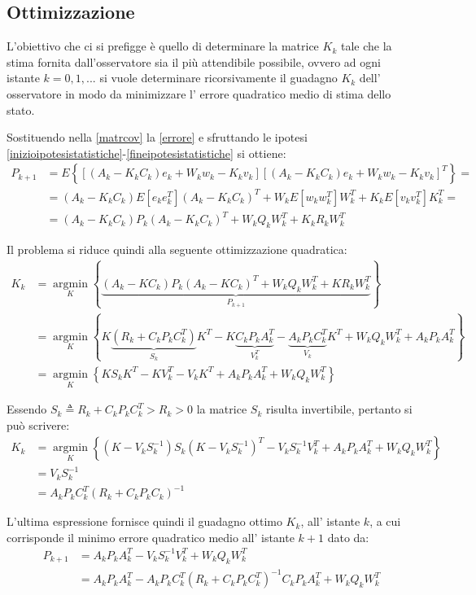 \subsection{Ottimizzazione}
L'obiettivo che ci si prefigge è quello di determinare la matrice $K_k$ tale che la stima fornita dall'osservatore sia il più attendibile possibile, ovvero ad ogni istante $k=0,1,...$ si vuole determinare ricorsivamente il guadagno $K_k$ dell' osservatore in modo da minimizzare l' errore quadratico medio di stima dello stato.

Sostituendo nella \eqref{matrcov} la \eqref{errore} e sfruttando le ipotesi \eqref{inizioipotesistatistiche}-\eqref{fineipotesistatistiche} si ottiene: 
\begin{equation}
\begin{split}
P_{k+1} &= E\left\{[(A_k - K_k C_k) e_k + W_k w_k - K_k v_k][(A_k -K_k C_k)e_k+W_k w_k-K_k v_k]^T\right\}=\\
 &= (A_k-K_kC_k)E[e_ke^T_k](A_k-K_kC_k)^T +W_kE[w_kw^T_k]W^T_k + K_kE[v_kv^T_k]K^T_k=\\
&= (A_k-K_kC_k)P_k(A_k-K_kC_k)^T + W_kQ_kW^T_k+K_kR_kW^T_k
\end{split}
\end{equation}

\noindent Il problema si riduce quindi alla seguente ottimizzazione quadratica: 
\begin{equation}
\begin{split}
K_k &= \underset{K}{\operatorname{argmin}} \left\{ \underbrace{(A_k-KC_k)P_k(A_k-KC_k)^T + W_kQ_kW^T_k+KR_kW^T_k}_{P_{k+1}} \right\} \\
&= \underset{K}{\operatorname{argmin}} \left\{ K\underbrace{(R_k+C_kP_kC_k^T)}_{S_k}K^T-K\underbrace{C_kP_kA_k^T}_{V^T_k}-\underbrace{A_kP_kC_k^T}_{V_k}K^T+W_kQ_kW_k^T+A_kP_kA_k^T \right\} \\
&=  \underset{K}{\operatorname{argmin}} \left\{KS_kK^T-KV^T_k-V_kK^T+A_kP_kA_k^T+W_kQ_kW_k^T\right\}
\end{split}
\end{equation}

\noindent Essendo $S_k \triangleq R_k+C_kP_kC_k^T > R_k > 0 $ la matrice $S_k$ risulta invertibile, pertanto si può scrivere: 
\begin{equation}
\begin{split}
K_k &= \underset{K}{\operatorname{argmin}} \left\{(K-V_kS^{-1}_k)S_k(K-V_kS^{-1}_k)^T - V_kS^{-1}_kV^T_k + A_kP_kA_k^T + W_kQ_kW_k^T\right\}\\ 
&= V_kS^{-1}_k\\
&= A_kP_kC_k^T(R_k+C_kP_kC_k)^{-1}
\end{split}
\end{equation}

\noindent L'ultima espressione fornisce quindi il guadagno ottimo $K_k$, all' istante $k$, a cui corrisponde il minimo errore quadratico medio all' istante $k+1$ dato da:
\begin{equation}
\begin{split}
P_{k+1}&=A_kP_kA_k^T-V_kS^{-1}_kV^T_k+W_kQ_kW_k^T\\ 
&=A_kP_kA_k^T-A_kP_kC_k^T(R_k+C_kP_kC_k^T)^{-1}C_kP_kA_k^T+W_kQ_kW_k^T
\end{split}
\end{equation}
\newpage